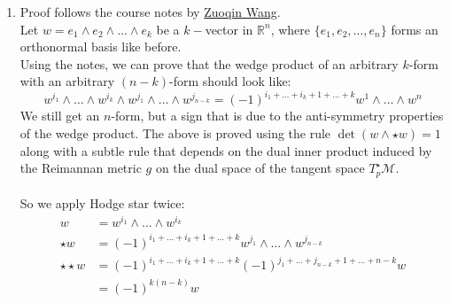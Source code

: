 \documentclass{article}
\def\cM{\mathcal{M}}
\begin{document}
\begin{enumerate}[label=(\alph*)]
    \item
    Proof follows the course notes 
    by \href{http://staff.ustc.edu.cn/~wangzuoq/Courses/16S-RiemGeom/Notes/Lec25.pdf}{Zuoqin Wang}.\\
    Let $w=e_1 \wedge e_2 \wedge \dots \wedge e_k$ be a $k-$vector in $\mathbb{R}^n$,
    where $\{e_1, e_2, \dots, e_n\}$ forms an orthonormal basis like before.\\
    Using the notes, we can prove that the wedge product of an 
    arbitrary $k$-form with an arbitrary $(n-k)$-form should look like:
    $$
        w^{i_1} \wedge \dots \wedge w^{i_k} \wedge w^{j_1} \wedge \dots \wedge w^{j_{n-k}} = 
        (-1)^{i_1 + \dots + i_k + 1 + \dots + k} w^{1} \wedge \dots \wedge w^{n}
    $$
    We still get an $n$-form, but a sign that is due to the anti-symmetry properties of the wedge product.
    The above is proved using the rule $\det(w \wedge \star w) = 1$
    along with a subtle rule that depends on the dual inner product induced
    by the Reimannan metric $g$ on the dual space of the tangent space $T_p^\star \cM$.\\\\
    So we apply Hodge star twice:
    \begin{align*}
        w &= w^{i_1} \wedge \dots \wedge w^{i_k} \\
        \star w &= (-1)^{i_1 + \dots + i_k + 1 + \dots + k} w^{j_1} \wedge \dots \wedge w^{j_{n-k}}\\
        \star \star w &= (-1)^{i_1 + \dots + i_k + 1 + \dots + k} (-1)^{j_1 + \dots + j_{n-k} + 1 + \dots + n-k} w\\
            &= (-1)^{k(n-k)} w
    \end{align*}
    
    

\end{enumerate}
\end{document}
